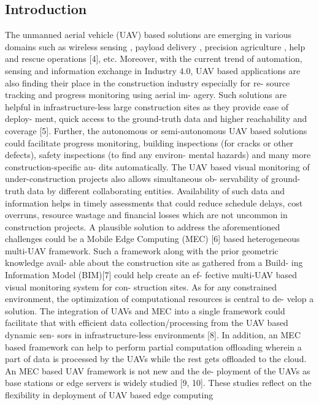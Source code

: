 \documentclass{article}
\begin{document}
\begin{multicols}{2}
\section{Introduction}
The unmanned aerial vehicle (UAV) based solutions are
emerging in various domains such as wireless sensing \cite{mozaffari2019tutorial},
payload delivery , precision agriculture , help and
rescue operations [4], etc. Moreover, with the current
trend of automation, sensing and information exchange
in Industry 4.0, UAV based applications are also finding
their place in the construction industry especially for re-
source tracking and progress monitoring using aerial im-
agery. Such solutions are helpful in infrastructure-less
large construction sites as they provide ease of deploy-
ment, quick access to the ground-truth data and higher
reachability and coverage [5]. Further, the autonomous
or semi-autonomous UAV based solutions could facilitate
progress monitoring, building inspections (for cracks or
other defects), safety inspections (to find any environ-
mental hazards) and many more construction-specific au-
dits automatically. The UAV based visual monitoring of
under-construction projects also allows simultaneous ob-
servability of ground-truth data by different collaborating
entities. Availability of such data and information helps
in timely assessments that could reduce schedule delays,
cost overruns, resource wastage and financial losses which
are not uncommon in construction projects.
A plausible solution to address the aforementioned
challenges could be a Mobile Edge Computing (MEC)
[6] based heterogeneous multi-UAV framework. Such a
framework along with the prior geometric knowledge avail-
able about the construction site as gathered from a Build-
ing Information Model (BIM)[7] could help create an ef-
fective multi-UAV based visual monitoring system for con-
struction sites. As for any constrained environment, the
optimization of computational resources is central to de-
velop a solution. The integration of UAVs and MEC into
a single framework could facilitate that with efficient data
collection/processing from the UAV based dynamic sen-
sors in infrastructure-less environments [8]. In addition,
an MEC based framework can help to perform partial
computation offloading wherein a part of data is processed
by the UAVs while the rest gets offloaded to the cloud.
An MEC based UAV framework is not new and the de-
ployment of the UAVs as base stations or edge servers
is widely studied [9, 10]. These studies reflect on the flexibility in deployment of UAV based edge computing

\end{multicols}
\end{document}
